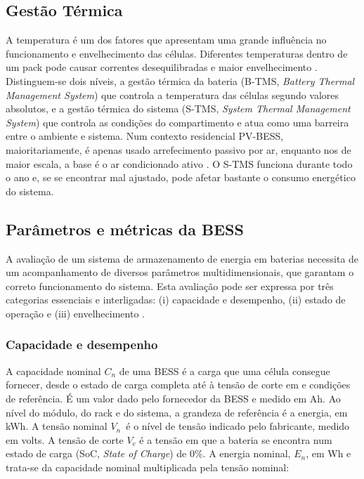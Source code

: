 \subsection{Gestão Térmica }
\label{sec:Ch2.1.5}

A temperatura é um dos fatores que apresentam uma grande influência no funcionamento e envelhecimento das células. Diferentes temperaturas dentro de um pack pode causar correntes desequilibradas e maior envelhecimento \cite{ Hesse2017}. Distinguem-se dois níveis, a gestão térmica da bateria (B-TMS, \textit{Battery Thermal Management System}) que controla a temperatura das células segundo valores absolutos, e a gestão térmica do sistema (S-TMS, \textit{System Thermal Management System}) que controla as condições do compartimento e atua como uma barreira entre o ambiente e sistema. Num contexto residencial PV-BESS, maioritariamente, é apenas usado arrefecimento passivo por ar, enquanto nos de maior escala, a base é o ar condicionado ativo \cite{ Hesse2017}. O S-TMS funciona durante todo o ano e, se se encontrar mal ajustado, pode afetar bastante o consumo energético do sistema. 

\subsection{Parâmetros e métricas da BESS}
\label{sec:Ch2.1.5}

A avaliação de um sistema de armazenamento de energia em baterias necessita de um acompanhamento de diversos parâmetros multidimensionais, que garantam o correto funcionamento do sistema. Esta avaliação pode ser expressa por três categorias essenciais e interligadas: (i) capacidade e desempenho, (ii) estado de operação e (iii) envelhecimento \cite{Nazaralizadeh2024}\cite{FEMP2023 }.

\subsubsection{Capacidade e desempenho}
\label{sec:Ch2.1.5.1}

A capacidade nominal $C_n$ de uma BESS é a carga que uma célula consegue fornecer, desde o estado de carga completa até à tensão de corte em e condições de referência. É um valor dado pelo fornecedor da BESS e medido em Ah. Ao nível do módulo, do rack e do sistema, a grandeza de referência é a energia, em kWh. A tensão nominal $V_n$\ é o nível de tensão indicado pelo fabricante, medido em volts. A tensão de corte $V_c$ é a tensão em que a bateria se encontra
num estado de carga (SoC, \textit{State of Charge}) de 0\%. A energia nominal, $E_n$, em Wh e trata-se da capacidade nominal multiplicada pela tensão nominal:


